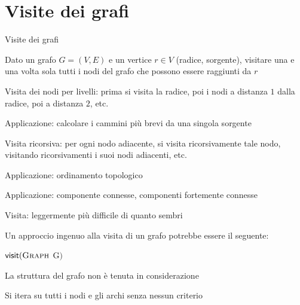 \section{Visite dei grafi}


\begin{frame}{Visite dei grafi}

\begin{myboxtitle}
Dato un grafo $G=(V,E)$ e un vertice $r \in V$ (\alert{radice}, \alert{sorgente}), visitare una e una volta sola tutti i nodi del grafo che possono essere raggiunti da $r$
\end{myboxtitle}

\begin{overprint}
\begin{myboxtitle}
Visita dei nodi per livelli: prima si visita la radice, poi i nodi a distanza $1$ dalla radice, poi a distanza $2$, etc.
\BI
\item Applicazione: calcolare i cammini più brevi da una singola sorgente
\EI
\end{myboxtitle}

\begin{myboxtitle}
Visita ricorsiva: per ogni nodo adiacente, si visita ricorsivamente tale nodo, visitando ricorsivamenti i suoi nodi adiacenti, etc.

\BI
\item Applicazione: ordinamento topologico
\item Applicazione: componente connesse, componenti fortemente connesse
\EI
\end{myboxtitle}
\end{overprint}
\end{frame}


\begin{frame}{Visita: leggermente più difficile di quanto sembri}

Un approccio ingenuo alla visita di un grafo potrebbe essere il seguente:

\begin{Procedure}
\caption[A]{$\textsf{visit}(\Graph\ $G$)$}
\end{Procedure}

\BIL
\item La struttura del grafo non è tenuta in considerazione
\item Si itera su tutti i nodi e gli archi senza nessun criterio
\EIL

\end{frame}


